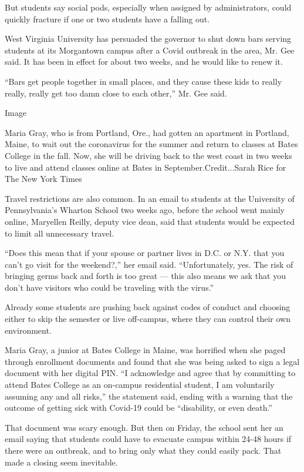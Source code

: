 But students say social pods, especially when assigned by
administrators, could quickly fracture if one or two students have a
falling out.

West Virginia University has persuaded the governor to shut down bars
serving students at its Morgantown campus after a Covid outbreak in the
area, Mr. Gee said. It has been in effect for about two weeks, and he
would like to renew it.

``Bars get people together in small places, and they cause these kids to
really really, really get too damn close to each other,'' Mr. Gee said.

Image

Maria Gray, who is from Portland, Ore., had gotten an apartment in
Portland, Maine, to wait out the coronavirus for the summer and return
to classes at Bates College in the fall. Now, she will be driving back
to the west coast in two weeks to live and attend classes online at
Bates in September.Credit...Sarah Rice for The New York Times

Travel restrictions are also common. In an email to students at the
University of Pennsylvania's Wharton School two weeks ago, before the
school went mainly online, Maryellen Reilly, deputy vice dean, said that
students would be expected to limit all unnecessary travel.

``Does this mean that if your spouse or partner lives in D.C. or N.Y.
that you can't go visit for the weekend?,'' her email said.
``Unfortunately, yes. The risk of bringing germs back and forth is too
great --- this also means we ask that you don't have visitors who could
be traveling with the virus.''

Already some students are pushing back against codes of conduct and
choosing either to skip the semester or live off-campus, where they can
control their own environment.

Maria Gray, a junior at Bates College in Maine, was horrified when she
paged through enrollment documents and found that she was being asked to
sign a legal document with her digital PIN. ``I acknowledge and agree
that by committing to attend Bates College as an on-campus residential
student, I am voluntarily assuming any and all risks,'' the statement
said, ending with a warning that the outcome of getting sick with
Covid-19 could be ``disability, or even death.''

That document was scary enough. But then on Friday, the school sent her
an email saying that students could have to evacuate campus within 24-48
hours if there were an outbreak, and to bring only what they could
easily pack. That made a closing seem inevitable.

